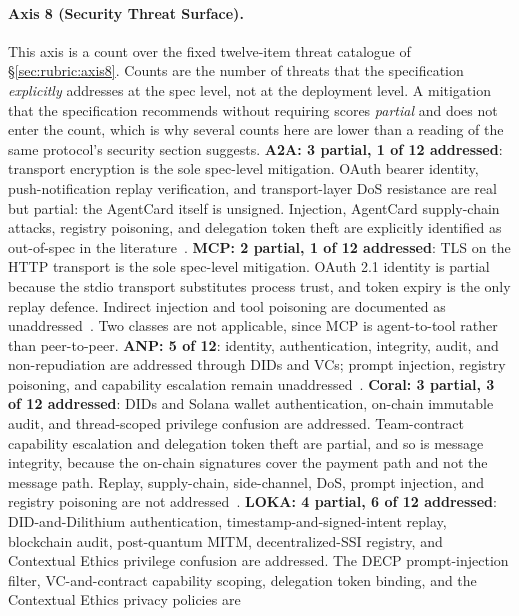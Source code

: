 \paragraph{Axis 8 (Security Threat Surface).}
This axis is a count over the fixed twelve-item threat
catalogue of \S\ref{sec:rubric:axis8}. Counts are the
number of threats that the specification \emph{explicitly}
addresses at the spec level, not at the deployment level.
A mitigation that the specification recommends without
requiring scores \emph{partial} and does not enter the
count, which is why several counts here are lower than a
reading of the same protocol's security section suggests.
\textbf{A2A: 3 partial, 1 of 12 addressed}: transport
encryption is the sole spec-level mitigation. OAuth bearer
identity, push-notification replay verification, and
transport-layer DoS resistance are real but partial:
the AgentCard itself is unsigned. Injection, AgentCard
supply-chain attacks,
registry poisoning, and delegation token theft are
explicitly identified as out-of-spec in the
literature~\cite{a2asecbench, a2a_weaknesses, spec_a2a}.
\textbf{MCP: 2 partial, 1 of 12 addressed}: TLS on the HTTP
transport is the sole spec-level mitigation. OAuth 2.1
identity is partial because the stdio transport substitutes
process trust, and token expiry is the only replay defence.
Indirect injection and tool poisoning are
documented as unaddressed~\cite{zhan2024injecagent,
protocol_exploits, spec_mcp}. Two classes are not
applicable, since MCP is agent-to-tool rather than
peer-to-peer. \textbf{ANP: 5 of 12}:
identity, authentication, integrity, audit, and
non-repudiation are addressed through DIDs and VCs;
prompt injection, registry poisoning, and capability
escalation remain unaddressed~\cite{spec_anp}.
\textbf{Coral: 3 partial, 3 of 12 addressed}: DIDs and Solana wallet
authentication, on-chain immutable audit, and thread-scoped
privilege confusion are addressed. Team-contract capability
escalation and delegation token theft are partial, and so is
message integrity, because the on-chain signatures cover the
payment path and not the message path. Replay, supply-chain,
side-channel, DoS, prompt injection, and registry poisoning are
not addressed~\cite{spec_coral}. \textbf{LOKA: 4 partial, 6 of 12 addressed}:
DID-and-Dilithium authentication, timestamp-and-signed-intent
replay, blockchain audit, post-quantum MITM,
decentralized-SSI registry, and Contextual Ethics privilege
confusion are addressed. The DECP prompt-injection filter,
VC-and-contract capability scoping, delegation token
binding, and the Contextual Ethics privacy policies are
